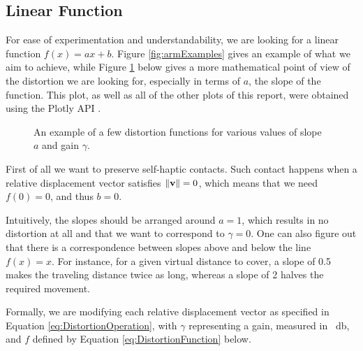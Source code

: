 \subsection{Linear Function}

For ease of experimentation and understandability, we are looking for a linear function $f(x) = ax + b$. Figure \ref{fig:armExamples} gives an example of what we aim to achieve, while Figure \ref{fig:plotsOfGamma} below gives a more mathematical point of view of the distortion we are looking for, especially in terms of $a$, the slope of the function. This plot, as well as all of the other plots of this report, were obtained using the Plotly API \cite{plotly}.

\begin{figure}[h]
    \caption{An example of a few distortion functions for various values of slope $a$ and gain $\gamma $.}\label{fig:plotsOfGamma}
\end{figure}

First of all we want to preserve self-haptic contacts. Such contact happens when a relative displacement vector satisfies $\lVert\mathbf{v}\rVert = 0$, which means that we need $f(0) = 0$, and thus $b = 0$.

Intuitively, the slopes should be arranged around $a=1$, which results in no distortion at all and that we want to correspond to $\gamma = 0$. One can also figure out that there is a correspondence between slopes above and below the line $f(x) = x$. For instance, for a given virtual distance to cover, a slope of \num{0.5} makes the traveling distance twice as long, whereas a slope of \num{2} halves the required movement.

Formally, we are modifying each relative displacement vector as specified in Equation \ref{eq:DistortionOperation}, with $\gamma$ representing a gain, measured in \SI{}{\decibel}, and $f$ defined by Equation \ref{eq:DistortionFunction} below.


